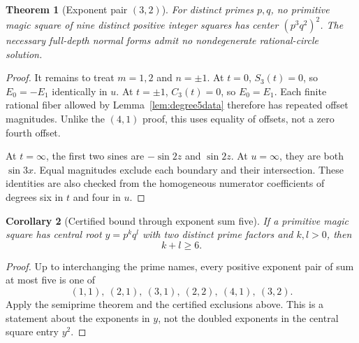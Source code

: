 \documentclass[11pt]{article}
\newtheorem{theorem}{Theorem}[section]
\newtheorem{corollary}[theorem]{Corollary}
\theoremstyle{definition}\newtheorem{definition}[theorem]{Definition}
\theoremstyle{remark}\newtheorem{remark}[theorem]{Remark}
\begin{document}
\begin{theorem}[Exponent pair $(3,2)$]\label{thm:32}
For distinct primes $p,q$, no primitive magic square of nine distinct positive integer squares has center $(p^3q^2)^2$. The necessary full-depth normal forms admit no nondegenerate rational-circle solution.
\end{theorem}
\begin{proof}
It remains to treat $m=1,2$ and $n=\pm1$. At $t=0$, $S_3(t)=0$, so $E_0=-E_1$ identically in $u$. At $t=\pm1$, $C_3(t)=0$, so $E_0=E_1$. Each finite rational fiber allowed by Lemma~\ref{lem:degree5data} therefore has repeated offset magnitudes. Unlike the $(4,1)$ proof, this uses equality of offsets, not a zero fourth offset.

At $t=\infty$, the first two sines are $-\sin2z$ and $\sin2z$. At $u=\infty$, they are both $\sin3x$. Equal magnitudes exclude each boundary and their intersection. These identities are also checked from the homogeneous numerator coefficients of degrees six in $t$ and four in $u$.
\end{proof}

\begin{corollary}[Certified bound through exponent sum five]\label{cor:bound5}
If a primitive magic square has central root $y=p^kq^l$ with two distinct prime factors and $k,l>0$, then
\[
\boxed{k+l\ge6.}
\]
\end{corollary}
\begin{proof}
Up to interchanging the prime names, every positive exponent pair of sum at most five is one of
\[
(1,1),\ (2,1),\ (3,1),\ (2,2),\ (4,1),\ (3,2).
\]
Apply the semiprime theorem and the certified exclusions above. This is a statement about the exponents in $y$, not the doubled exponents in the central square entry $y^2$.
\end{proof}
\end{document}
